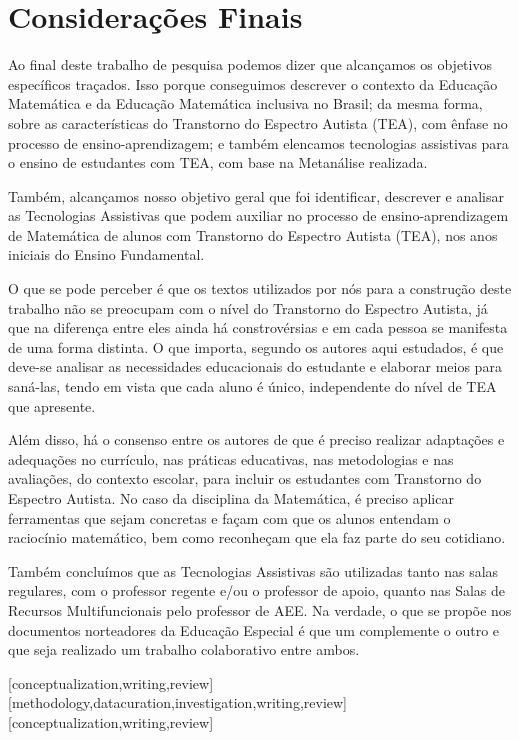 \documentclass[portuguese]{textolivre}
\begin{document}
\section{Considerações Finais}
Ao final deste trabalho de pesquisa podemos dizer que alcançamos os
objetivos específicos traçados. Isso porque conseguimos descrever o
contexto da Educação Matemática e da Educação Matemática inclusiva no
Brasil; da mesma forma, sobre as características do Transtorno do
Espectro Autista (TEA), com ênfase no processo de ensino-aprendizagem; e
também elencamos tecnologias assistivas para o ensino de estudantes com
TEA, com base na Metanálise realizada.

Também, alcançamos nosso objetivo geral que foi identificar, descrever e
analisar as Tecnologias Assistivas que podem auxiliar no processo de
ensino-aprendizagem de Matemática de alunos com Transtorno do Espectro
Autista (TEA), nos anos iniciais do Ensino Fundamental.

O que se pode perceber é que os textos utilizados por nós para a
construção deste trabalho não se preocupam com o nível do Transtorno do
Espectro Autista, já que na diferença entre eles ainda há constrovérsias
e em cada pessoa se manifesta de uma forma distinta. O que importa,
segundo os autores aqui estudados, é que deve-se analisar as
necessidades educacionais do estudante e elaborar meios para saná-las,
tendo em vista que cada aluno é único, independente do nível de TEA que
apresente.

Além disso, há o consenso entre os autores de que é preciso realizar
adaptações e adequações no currículo, nas práticas educativas, nas
metodologias e nas avaliações, do contexto escolar, para incluir os
estudantes com Transtorno do Espectro Autista. No caso da disciplina da
Matemática, é preciso aplicar ferramentas que sejam concretas e façam
com que os alunos entendam o raciocínio matemático, bem como reconheçam
que ela faz parte do seu cotidiano.

Também concluímos que as Tecnologias Assistivas são utilizadas tanto nas
salas regulares, com o professor regente e/ou o professor de apoio,
quanto nas Salas de Recursos Multifuncionais pelo professor de AEE. Na
verdade, o que se propõe nos documentos norteadores da Educação Especial
é que um complemente o outro e que seja realizado um trabalho
colaborativo entre ambos.



\printbibliography\label{sec-bib}
\begin{contributors}
[conceptualization,writing,review]
[methodology,datacuration,investigation,writing,review]
[conceptualization,writing,review]
\end{contributors}
\end{document}
